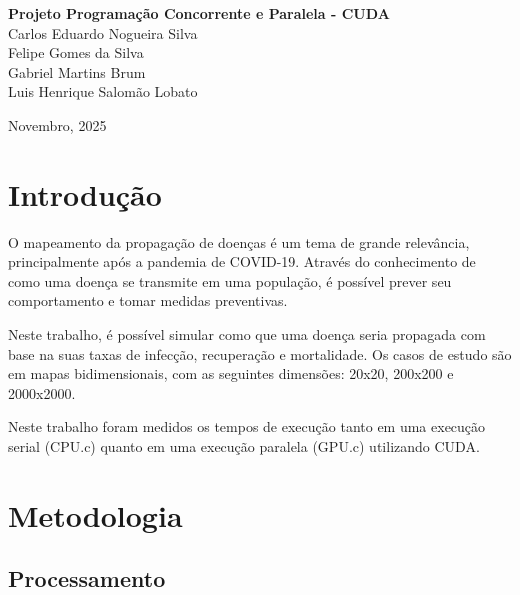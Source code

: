 \documentclass{article}
\begin{document}
\begin{titlepage}
	\begin{center}
	
	\vspace{115pt}
    \textbf{\Huge{Projeto Programação Concorrente e Paralela - CUDA}}\\
        
	\vspace{115pt}
    Carlos Eduardo Nogueira Silva \\
    Felipe Gomes da Silva \\
    Gabriel Martins Brum \\
    Luis Henrique Salomão Lobato \\
	\end{center}
	
	\vspace{1cm}
	\begin{center}
		\vspace{\fill}
    \large{Novembro, 2025} 
	\end{center}
\end{titlepage}
\date{November 2025}




\section{Introdução}

O mapeamento da propagação de doenças é um tema de grande relevância, principalmente após a pandemia de COVID-19. Através do conhecimento de como uma doença se transmite em uma população, é possível prever seu comportamento e tomar medidas preventivas. 

Neste trabalho, é possível simular como que uma doença seria propagada com base na suas taxas de infecção, recuperação e mortalidade. Os casos de estudo são em mapas bidimensionais, com as seguintes dimensões: 20x20, 200x200 e 2000x2000.

Neste trabalho foram medidos os tempos de execução tanto em uma execução serial (CPU.c) quanto em uma execução paralela (GPU.c) utilizando CUDA.

\section{Metodologia}
\subsection{Processamento}
\end{document}
